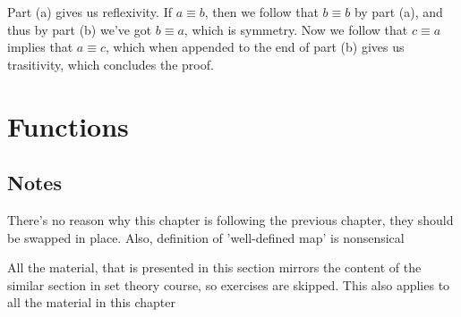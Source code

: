 \documentclass[11pt,oneside,titlepage]{book}
\begin{document}
Part (a) gives us reflexivity. If $a \equiv b$, then we follow that $b
\equiv b$ by part (a), and thus by part (b) we've got $b \equiv a$,
which is symmetry. Now we follow that $c \equiv a$ implies that $a
\equiv c$, which when appended to the end of part (b) gives us
trasitivity, which concludes the proof.

\section{Functions}

\subsection*{Notes}

There's no reason why this chapter is following the previous chapter,
they should be swapped in place. Also, definition of 'well-defined
map' is nonsensical

All the material, that is presented in this section mirrors the
content of the similar section in set theory course, so exercises
are skipped. This also applies to all the material in this chapter
\end{document}
